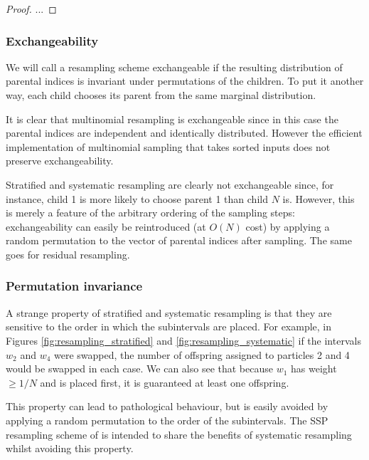 \begin{proof}
...
\end{proof}




\subsubsection{Exchangeability \seb{$\sim$} }
We will call a resampling scheme exchangeable if the resulting distribution of parental indices is invariant under permutations of the children. To put it another way, each child chooses its parent from the same marginal distribution.

It is clear that multinomial resampling is exchangeable since in this case the parental indices are independent and identically distributed. However the efficient implementation of multinomial sampling that takes sorted inputs does not preserve exchangeability.

Stratified and systematic resampling are clearly not exchangeable since, for instance, child 1 is more likely to choose parent 1 than child $N$ is. However, this is merely a feature of the arbitrary ordering of the sampling steps: exchangeability can easily be reintroduced (at $O(N)$ cost) by applying a random permutation to the vector of parental indices after sampling.
The same goes for residual resampling.





\subsubsection{Permutation invariance \seb{$\checkmark$} }
A strange property of stratified and systematic resampling is that they are sensitive to the order in which the subintervals are placed. For example, in Figures \ref{fig:resampling_stratified} and \ref{fig:resampling_systematic} if the intervals $w_2$ and $w_4$ were swapped, the number of offspring assigned to particles 2 and 4 would be swapped in each case. 
We can also see that because $w_1$ has weight $\geq 1/N$ and is placed first, it is guaranteed at least one offspring.

This property can lead to pathological behaviour, but is easily avoided by applying a random permutation to the order of the subintervals.
The SSP resampling scheme of \textcite{gerber2017} is intended to share the benefits of systematic resampling whilst avoiding this property.




